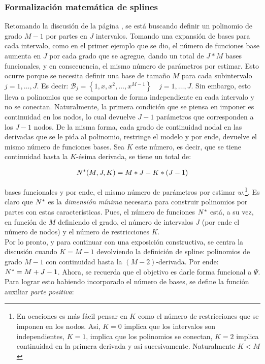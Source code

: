 \documentclass[../Main/Main.tex]{subfiles}
\begin{document}
\subsubsection{Formalización matemática de splines}
Retomando la discusión de la página \pageref{sec:PolisYSplines}, se está buscando definir un polinomio de grado $M-1$ por partes en $J$ intervalos. Tomando una expansión de bases para cada intervalo, como en el primer ejemplo que se dio, el número de funciones base aumenta en $J$ por cada grado que se agregue, dando un total de $J*M$ bases funcionales, y en consecuencia, el mismo número de parámetros por estimar. Esto ocurre porque se necesita definir una base de tamaño $M$ para cada subintervalo $j = 1,\ldots,J$. Es decir: $\mathcal{B}_j = \left\{1,x,x^2,\ldots,x^{M-1}\right\} \quad j = 1,\ldots,J$. Sin embargo, esto lleva a polinomios que se comportan de forma independiente en cada intervalo y no se conectan. Naturalmente, la primera condición que se piensa en imponer es continuidad en los nodos, lo cual devuelve $J-1$ parámetros que corresponden a los $J-1$ nodos. De la misma forma, cada grado de continuidad nodal en las derivadas que se le pida al polinomio, restringe el modelo y por ende, devuelve el mismo número de funciones bases. Sea $K$ este número, es decir, que se tiene continuidad hasta la $K$-ésima derivada, se tiene un total de:

\begin{align}
	N^*(M,J,K) = M*J - K*(J-1) \label{ec:NEstrella}
\end{align}


bases funcionales y por ende, el mismo número de parámetros por estimar $w$.\footnote{En ocaciones es más fácil pensar en $K$ como el número de restricciones que se imponen en los nodos. Asi, $K=0$ implica que los intervalos son independientes, $K = 1$, implica que los polinomios se conectan, $K = 2$ implica continuidad en la primera derivada y asi sucesivamente. Naturalmente $K<M$}. Es claro que $N^*$ es la \textit{dimensión mínima} necesaria para construir polinomios por partes con estas características. Pues, el número de funciones $N^*$ está, a su vez, en función de $M$ definiendo el grado, el número de intervalos $J$ (por ende el número de nodos) y el número de restricciones $K$.\\

Por lo pronto, y para continuar con una exposición constructiva, se centra la discusión cuando $K = M - 1$ devolviendo la definición de spline: polinomios de grado $M-1$ con continuidad hasta la $(M-2)$-derivada. Por ende: $N^* = M + J - 1$. Ahora, se recuerda que el objetivo es darle forma funcional a $\Psi$. Para lograr esto habiendo incorporado el número de bases, se define la función auxiliar \textit{parte positiva}:
\end{document}
